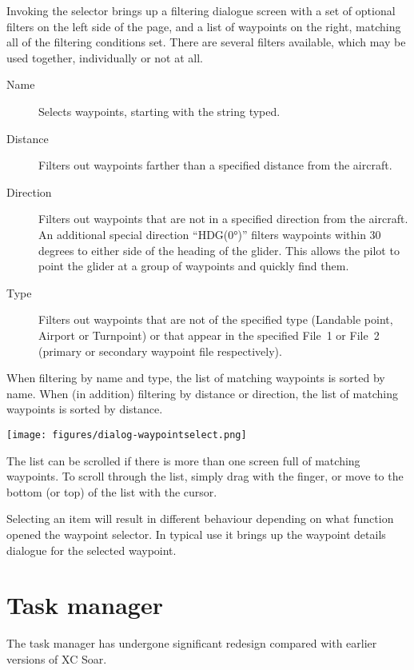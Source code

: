 Invoking the selector brings up a filtering dialogue screen with a set of 
optional filters on the left side of the page, and a list of waypoints on the
right, matching all of the filtering conditions set.
There are several filters available, which may be used together,
individually or not at all.
\begin{description}
\item[Name] Selects waypoints, starting with the string typed.
\item[Distance] Filters out waypoints farther than a specified distance from the 
  aircraft.
\item[Direction] Filters out waypoints that are not in a specified direction 
  from the aircraft. 
  An additional special direction ``HDG(0°)'' filters waypoints within 30
  degrees to either side of the heading of the glider.  This allows the pilot 
  to point the glider at a group of waypoints and quickly find them.
\item[Type] Filters out waypoints that are not of the specified type
(Landable point, Airport or Turnpoint) or that appear in the specified File~1 or
File~2 (primary or secondary waypoint file respectively).
\end{description}
When filtering by name and type, the list of matching waypoints is
sorted by name. When (in addition) filtering by distance or direction,
 the list of matching waypoints is sorted by distance.

\begin{center}
\texttt{[image: figures/dialog-waypointselect.png]}
\end{center}

The list can be scrolled if there is more than one screen full of
matching waypoints.  To scroll through the list, simply drag with the finger, or
move to the bottom (or top) of the list with the cursor.   

Selecting an item will result in different behaviour
depending on what function opened the waypoint selector.  In typical
use it brings up the waypoint details dialogue for the selected
waypoint.

\section{Task manager}\label{sec:task-manager-dialog}
\begin{it}  The task manager has undergone significant redesign compared with 
earlier versions of XC Soar.\end{it}

